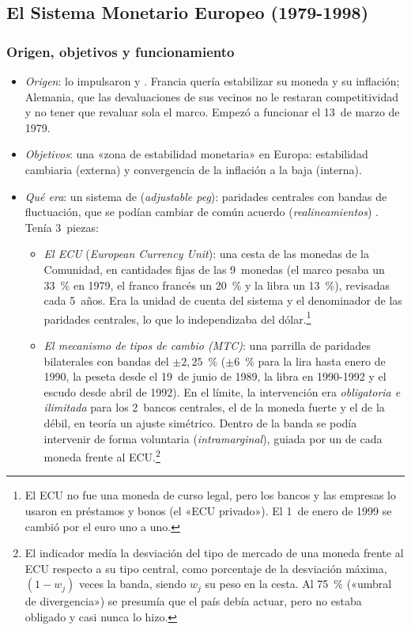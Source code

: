 \documentclass[11pt]{article}
\begin{document}
\subsection{El Sistema Monetario Europeo (1979-1998)}\label{sec:sme}

\subsubsection{Origen, objetivos y funcionamiento}\label{sec:sme-funcionamiento}

\begin{itemize}
\item \emph{Origen}: lo impulsaron  y . Francia quería estabilizar su moneda y su inflación; Alemania, que las devaluaciones de sus vecinos no le restaran competitividad y no tener que revaluar sola el marco. Empezó a funcionar el 13~de marzo de 1979.
\item \emph{Objetivos}: una «zona de estabilidad monetaria» en Europa: estabilidad cambiaria (externa) y convergencia de la inflación a la baja (interna).
\item \emph{Qué era}: un sistema de  (\emph{adjustable peg}): paridades centrales con bandas de fluctuación, que se podían cambiar de común acuerdo (\emph{realineamientos}) . Tenía 3~piezas:
  \begin{itemize}
  \item \emph{El ECU} (\emph{European Currency Unit}): una cesta de las monedas de la Comunidad, en cantidades fijas de las 9~monedas (el marco pesaba un 33~\% en 1979, el franco francés un 20~\% y la libra un 13~\%), revisadas cada 5~años. Era la unidad de cuenta del sistema y el denominador de las paridades centrales, lo que lo independizaba del dólar\nocite{BPI1979Informe}.\footnote{El ECU no fue una moneda de curso legal, pero los bancos y las empresas lo usaron en préstamos y bonos (el «ECU privado»). El 1~de enero de 1999 se cambió por el euro uno a uno.}
  \item \emph{El mecanismo de tipos de cambio (MTC)}: una parrilla de paridades bilaterales con bandas del $\pm2{,}25$~\% ($\pm6$~\% para la lira hasta enero de 1990, la peseta desde el 19~de junio de 1989, la libra en 1990-1992 y el escudo desde abril de 1992)\nocite{BPI1990Informe,BPI1991Informe}. En el límite, la intervención era \emph{obligatoria e ilimitada} para los 2~bancos centrales, el de la moneda fuerte y el de la débil, en teoría un ajuste simétrico. Dentro de la banda se podía intervenir de forma voluntaria (\emph{intramarginal}), guiada por un  de cada moneda frente al ECU.\footnote{El indicador medía la desviación del tipo de mercado de una moneda frente al ECU respecto a su tipo central, como porcentaje de la desviación máxima, $(1-w_j)$ veces la banda, siendo $w_j$ su peso en la cesta. Al 75~\% («umbral de divergencia») se presumía que el país debía actuar, pero no estaba obligado y casi nunca lo hizo.}

\end{itemize}
\end{itemize}
\end{document}
